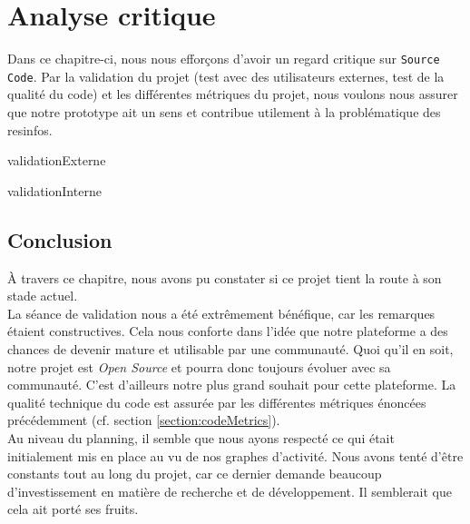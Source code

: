 \chapter{Analyse critique}
\label{section:validation}

Dans ce chapitre-ci, nous nous efforçons d'avoir un regard critique sur \texttt{Source Code}. Par la validation du projet (test avec des utilisateurs externes, test de la qualité du code) et les différentes métriques du projet, nous voulons nous assurer que notre prototype ait un sens et contribue utilement à la problématique des \glspl{resinfo}.

{validationExterne}

{validationInterne}

\section{Conclusion}

À travers ce chapitre, nous avons pu constater si ce projet tient la route à son stade actuel.\\

La séance de validation nous a été extrêmement bénéfique, car les remarques étaient constructives. 
Cela nous conforte dans l'idée que notre plateforme a des chances de devenir mature et utilisable par une communauté. 
Quoi qu'il en soit, notre projet est \textit{Open Source} et pourra donc toujours évoluer avec sa communauté. 
C'est d'ailleurs notre plus grand souhait pour cette plateforme.
La qualité technique du code est assurée par les différentes métriques énoncées précédemment (cf. section \ref{section:codeMetrics}).\\

Au niveau du planning, il semble que nous ayons respecté ce qui était initialement mis en place au vu de nos graphes d'activité. 
Nous avons tenté d'être constants tout au long du projet, car ce dernier demande beaucoup d'investissement en matière de recherche et de développement. 
Il semblerait que cela ait porté ses fruits.